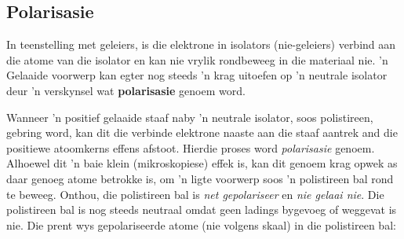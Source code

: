 

\subsection*{Polarisasie}
            \nopagebreak
In teenstelling met geleiers, is die elektrone in isolators (nie-geleiers) verbind aan die atome van die isolator en kan nie vrylik rondbeweeg in die materiaal nie. 'n Gelaaide voorwerp kan egter nog steeds 'n krag uitoefen op 'n neutrale isolator deur 'n verskynsel wat \textbf{polarisasie} genoem word. \par

Wanneer 'n positief gelaaide staaf naby 'n neutrale isolator, soos polistireen, gebring word, kan dit die verbinde elektrone naaste aan die staaf aantrek and die positiewe atoomkerns effens afstoot. Hierdie proses word \textsl{polarisasie} genoem. Alhoewel dit 'n baie klein (mikroskopiese) effek is, kan dit genoem krag opwek as daar genoeg atome betrokke is, om 'n ligte voorwerp soos 'n polistireen bal rond te beweeg. Onthou, die polistireen bal is \textsl{net gepolariseer} en \textsl{nie gelaai nie}. Die polistireen bal is nog steeds neutraal omdat geen ladings bygevoeg of weggevat is nie. Die prent wys gepolariseerde atome (nie volgens skaal) in die polistireen bal:\par


